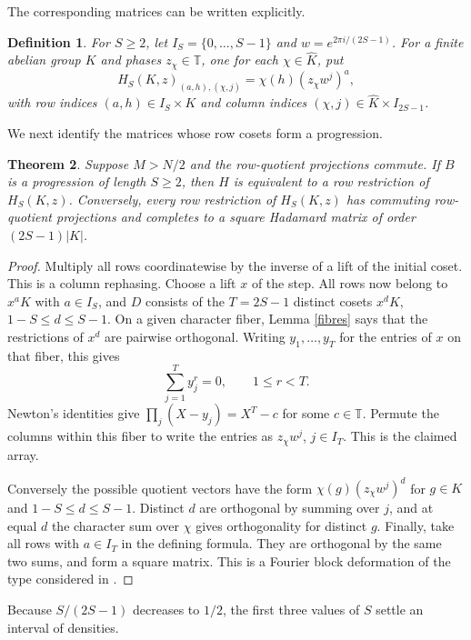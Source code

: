 \documentclass[11pt,a4paper]{article}
\newtheorem{thm}{Theorem}[section]
\newtheorem{defn}[thm]{Definition}
\begin{document}
The corresponding matrices can be written explicitly.

\begin{defn}\label{array}
For $S\geq2$, let $I_S=\{0,\ldots,S-1\}$ and $w=e^{2\pi i/(2S-1)}$. For a finite abelian group $K$ and phases $z_\chi\in\mathbb T$, one for each $\chi\in\widehat K$, put
\[
 H_S(K,z)_{(a,h),(\chi,j)}=\chi(h)(z_\chi w^j)^a ,
\]
with row indices $(a,h)\in I_S\times K$ and column indices $(\chi,j)\in\widehat K\times I_{2S-1}$.
\end{defn}

We next identify the matrices whose row cosets form a progression.

\begin{thm}\label{bands}
Suppose $M>N/2$ and the row-quotient projections commute. If $B$ is a progression of length $S\geq2$, then $H$ is equivalent to a row restriction of $H_S(K,z)$. Conversely, every row restriction of $H_S(K,z)$ has commuting row-quotient projections and completes to a square Hadamard matrix of order $(2S-1)|K|$.
\end{thm}
\begin{proof}
Multiply all rows coordinatewise by the inverse of a lift of the initial coset. This is a column rephasing. Choose a lift $x$ of the step. All rows now belong to $x^aK$ with $a\in I_S$, and $D$ consists of the $T=2S-1$ distinct cosets $x^d K$, $1-S\leq d\leq S-1$. On a given character fiber, Lemma \ref{fibres} says that the restrictions of $x^d$ are pairwise orthogonal. Writing $y_1,\ldots,y_T$ for the entries of $x$ on that fiber, this gives
\[
 \sum_{j=1}^T y_j^r=0,\qquad 1\leq r<T.
\]
Newton's identities give $\prod_j(X-y_j)=X^T-c$ for some $c\in\mathbb T$. Permute the columns within this fiber to write the entries as $z_\chi w^j$, $j\in I_T$. This is the claimed array.

Conversely the possible quotient vectors have the form $\chi(g)(z_\chi w^j)^d$ for $g\in K$ and $1-S\leq d\leq S-1$. Distinct $d$ are orthogonal by summing over $j$, and at equal $d$ the character sum over $\chi$ gives orthogonality for distinct $g$. Finally, take all rows with $a\in I_T$ in the defining formula. They are orthogonal by the same two sums, and form a square matrix. This is a Fourier block deformation of the type considered in \cite{dita}.
\end{proof}

Because $S/(2S-1)$ decreases to $1/2$, the first three values of $S$ settle an interval of densities.
\end{document}
